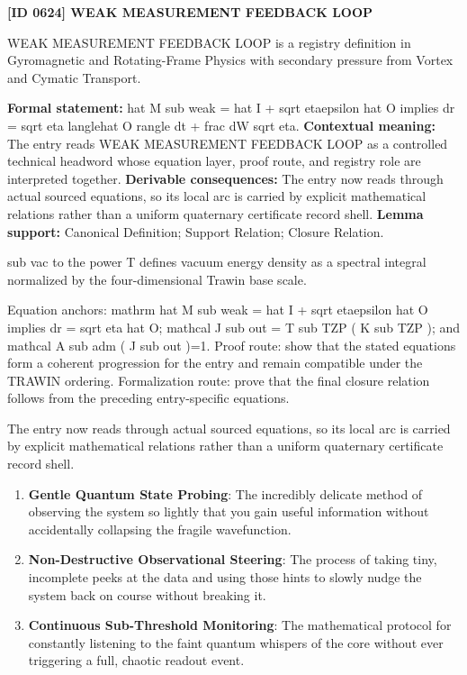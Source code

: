 \clearpage
\noindent\textbf{[ID 0624] WEAK MEASUREMENT FEEDBACK LOOP}\par
\vspace{0.35em}
\begingroup\small
{}
WEAK MEASUREMENT FEEDBACK LOOP is a registry definition in Gyromagnetic and Rotating-Frame Physics with secondary pressure from Vortex and Cymatic Transport.

\begingroup\footnotesize\setlength{\emergencystretch}{3em}\sloppy
\textbf{Formal statement:} hat M sub weak = hat I + sqrt etaepsilon hat O implies dr = sqrt eta langlehat O rangle dt + frac dW sqrt eta. \textbf{Contextual meaning:} The entry reads WEAK MEASUREMENT FEEDBACK LOOP as a controlled technical headword whose equation layer, proof route, and registry role are interpreted together. \textbf{Derivable consequences:} The entry now reads through actual sourced equations, so its local arc is carried by explicit mathematical relations rather than a uniform quaternary certificate record shell. \textbf{Lemma support:} Canonical Definition; Support Relation; Closure Relation.\par
\endgroup

sub vac to the power T defines vacuum energy density as a spectral integral normalized by the four-dimensional Trawin base scale.

Equation anchors: mathrm hat M sub weak = hat I + sqrt etaepsilon hat O implies dr = sqrt eta hat O; mathcal J sub out = T sub TZP ( K sub TZP ); and mathcal A sub adm ( J sub out )=1. Proof route: show that the stated equations form a coherent progression for the entry and remain compatible under the TRAWIN ordering. Formalization route: prove that the final closure relation follows from the preceding entry-specific equations.

The entry now reads through actual sourced equations, so its local arc is carried by explicit mathematical relations rather than a uniform quaternary certificate record shell.
\endgroup

\begin{enumerate}[leftmargin=1.6em,itemsep=6pt,topsep=4pt]
\item \textbf{Gentle Quantum State Probing}: The incredibly delicate method of observing the system so lightly that you gain useful information without accidentally collapsing the fragile wavefunction.
\item \textbf{Non-Destructive Observational Steering}: The process of taking tiny, incomplete peeks at the data and using those hints to slowly nudge the system back on course without breaking it.
\item \textbf{Continuous Sub-Threshold Monitoring}: The mathematical protocol for constantly listening to the faint quantum whispers of the core without ever triggering a full, chaotic readout event.
\end{enumerate}


